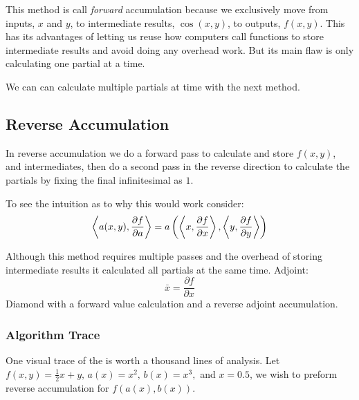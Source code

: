 This method is call {\em forward } accumulation because we exclusively move from inputs, $x$ and $y$, to intermediate results, $\cos(x,y)$, to outputs, $f(x,y)$.
This has its advantages of letting us reuse how computers call functions to store intermediate results and avoid doing any overhead work.
But its main flaw is only calculating one partial at a time.

We can can calculate multiple partials at time with the next method.

\subsection{Reverse Accumulation}
In reverse accumulation we do a forward pass to calculate and store $f(x,y)$,
and intermediates, 
then do a second pass in the reverse direction to calculate the partials by fixing the final infinitesimal as $1$.

To see the intuition as to why this would work consider:
\[\left\langle a(x,y),\frac{\partial f}{\partial a} \right\rangle = a\left(\left\langle x,\frac{\partial f}{\partial x} \right\rangle,\left\langle y,\frac{\partial f}{\partial y} \right\rangle\right)\]


Although this method requires multiple passes and the overhead of storing intermediate results it calculated all partials at the same time.
Adjoint: 
\[\bar{x} = \frac{\partial f}{\partial x}\]
Diamond with a forward value calculation and a reverse adjoint accumulation.

\subsubsection{Algorithm Trace}
One visual trace of the is worth a thousand lines of analysis.
Let $f(x,y) = \frac{1}{2}x+y,\,a(x)=x^2,\,b(x)=x^3,$ and $x=0.5$, 
we wish to preform reverse accumulation for $f(a(x),b(x))$.

